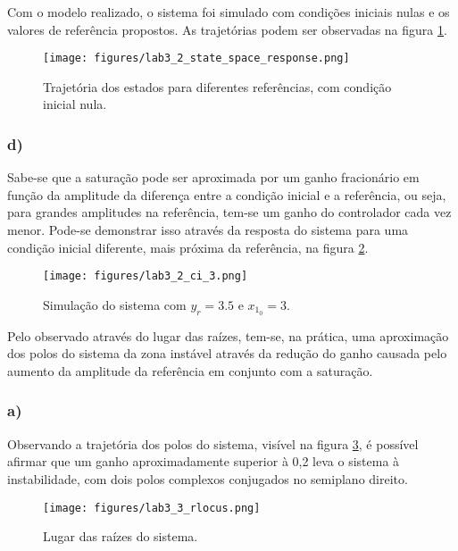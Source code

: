 \documentclass[a4paper]{report}
\begin{document}
Com o modelo realizado, o sistema foi simulado com condições iniciais nulas e os valores de referência propostos. As trajetórias podem ser observadas na figura \ref{fig:figures-lab3_2_state_space_response-png}.

\begin{figure}[H]
    \centering
    \texttt{[image: figures/lab3\_2\_state\_space\_response.png]}
    \caption{Trajetória dos estados para diferentes referências, com condição inicial nula.}
    \label{fig:figures-lab3_2_state_space_response-png}
\end{figure}

\subsubsection*{d)}

Sabe-se que a saturação pode ser aproximada por um ganho fracionário em função da amplitude da diferença entre a condição inicial e a referência, ou seja, para grandes amplitudes na referência, tem-se um ganho do controlador cada vez menor. Pode-se demonstrar isso através da resposta do sistema para uma condição inicial diferente, mais próxima da referência, na figura \ref{fig:figures-lab3_2_ci_3-png}.

\begin{figure}[H]
    \centering
    \texttt{[image: figures/lab3\_2\_ci\_3.png]}
    \caption{Simulação do sistema com $y_r=3.5$ e $x_{1_0}=3$.}
    \label{fig:figures-lab3_2_ci_3-png}
\end{figure}

Pelo observado através do lugar das raízes, tem-se, na prática, uma aproximação dos polos do sistema da zona instável através da redução do ganho causada pelo aumento da amplitude da referência em conjunto com a saturação.


\subsubsection*{a)}

Observando a trajetória dos polos do sistema, visível na figura \ref{fig:figures-lab3_3_rlocus-png}, é possível afirmar que um ganho aproximadamente superior à 0,2 leva o sistema à instabilidade, com dois polos complexos conjugados no semiplano direito.

\begin{figure}[H]
    \centering
    \texttt{[image: figures/lab3\_3\_rlocus.png]}
    \caption{Lugar das raízes do sistema.}
    \label{fig:figures-lab3_3_rlocus-png}
\end{figure}
\end{document}
